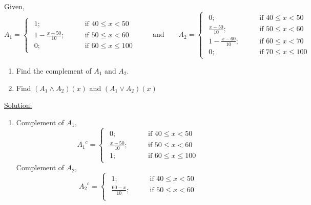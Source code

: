 \documentclass[../main-sheet.tex]{subfiles}
\begin{document}
\begin{ex}
    Given,
    \[
        A_1=\begin{cases}
            \begin{aligned}
                1; \qquad&\text{if }40\leq x<50\\
                1-\frac{x-50}{10}; \qquad&\text{if }50\leq x<60\\
                0; \qquad&\text{if }60\leq x\leq 100
            \end{aligned}
    \end{cases}
    \qquad\text{and}\qquad
    A_2=\begin{cases}
        \begin{aligned}
            0; \qquad&\text{if }40\leq x<50\\
            \frac{x-50}{10}; \qquad&\text{if }50\leq x<60\\
            1-\frac{x-60}{10}; \qquad&\text{if }60\leq x<70\\
            0; \qquad&\text{if }70\leq x\leq 100
        \end{aligned}
    \end{cases}
    \]
    \begin{enumerate}
        \item Find the complement of \(A_1\) and \(A_2\).
        \item Find \((A_1\wedge A_2)(x)\) and \((A_1\vee A_2)(x)\)
    \end{enumerate}
    \underline{Solution:}
    \begin{enumerate}
        \item Complement of \(A_1\),
        \[
            {A_1}^c=\begin{cases}
                \begin{aligned}
                    0; \qquad&\text{if }40\leq x<50\\
                    \frac{x-50}{10}; \qquad&\text{if }50\leq x<60\\
                    1; \qquad&\text{if }60\leq x\leq 100
                \end{aligned}
            \end{cases}
            \]
        Complement of \(A_2\),
        \[
            {A_2}^c=\begin{cases}
                \begin{aligned}
                    1; \qquad&\text{if }40\leq x<50\\
                    \frac{60-x}{10}; \qquad&\text{if }50\leq x<60\\

\end{aligned}
\end{cases}\]
\end{enumerate}
\end{ex}
\end{document}
